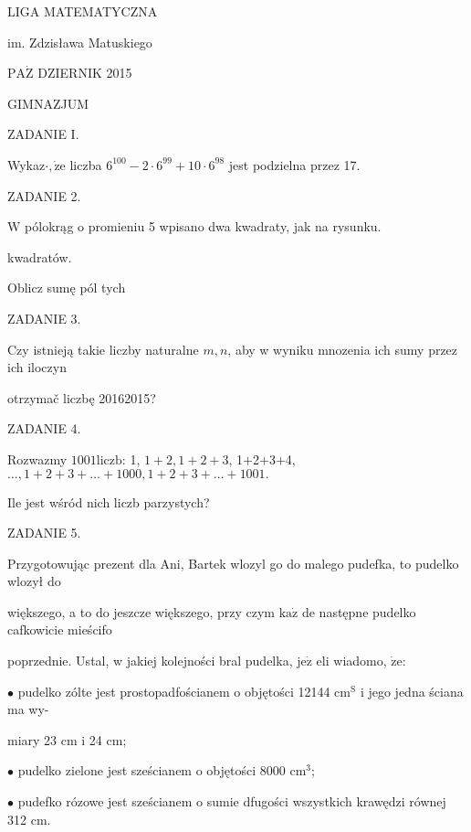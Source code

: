 \documentclass[a4paper,12pt]{article}
\begin{document}
LIGA MATEMATYCZNA

im. Zdzisława Matuskiego

$\mathrm{P}\mathrm{A}\dot{\mathrm{Z}}$ DZIERNIK 2015

GIMNAZJUM

ZADANIE I.

Wykaz$\cdot, \dot{\mathrm{z}}\mathrm{e}$ liczba $6^{100}-2\cdot 6^{99}+10\cdot 6^{98}$ jest podzielna przez 17.

ZADANIE 2.

$\mathrm{W}$ pólokrąg o promieniu 5 wpisano dwa kwadraty, jak na rysunku.

kwadratów.

Oblicz sumę pól tych

ZADANIE 3.

Czy istnieją takie liczby naturalne $m, n$, aby w wyniku mnozenia ich sumy przez ich iloczyn

otrzymač liczbę 20162015?

ZADANIE 4.

Rozwazmy $1001\mathrm{l}\mathrm{i}\mathrm{c}\mathrm{z}\mathrm{b}$: 1, $1+2, 1+2+3$, 1$+$2$+$3$+$4, $\ldots, 1+2+3+\ldots+1000, 1+2+3+\ldots+1001.$

Ile jest wśród nich liczb parzystych?

ZADANIE 5.

Przygotowując prezent dla Ani, Bartek wlozyl go do malego pudefka, to pudelko wlozył do

większego, a to do jeszcze większego, przy czym $\mathrm{k}\mathrm{a}\dot{\mathrm{z}}$ de następne pudelko cafkowicie mieścifo

poprzednie. Ustal, w jakiej kolejności bral pudelka, $\mathrm{j}\mathrm{e}\dot{\mathrm{z}}$ eli wiadomo, $\dot{\mathrm{z}}\mathrm{e}$:

$\bullet$ pudelko zólte jest prostopadfościanem o objętości 12144 $\mathrm{c}\mathrm{m}^{\mathrm{S}}$ i jego jedna ściana ma wy-

miary 23 cm i 24 cm;

$\bullet$ pudelko zielone jest sześcianem o objętości 8000 $\mathrm{c}\mathrm{m}^{3}$;

$\bullet$ pudefko rózowe jest sześcianem o sumie dfugości wszystkich krawędzi równej 312 cm.
\end{document}
